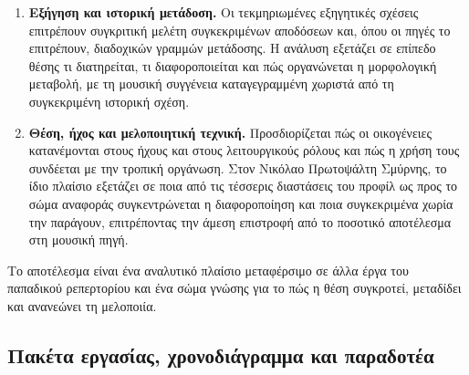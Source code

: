 \documentclass[11pt,a4paper]{article}
\begin{document}
\begin{enumerate}[label=\textbf{\arabic*.},leftmargin=2.2em]
\item \textbf{Εξήγηση και ιστορική μετάδοση.} Οι τεκμηριωμένες εξηγητικές σχέσεις επιτρέπουν συγκριτική μελέτη συγκεκριμένων αποδόσεων και, όπου οι πηγές το επιτρέπουν, διαδοχικών γραμμών μετάδοσης. Η ανάλυση εξετάζει σε επίπεδο θέσης τι διατηρείται, τι διαφοροποιείται και πώς οργανώνεται η μορφολογική μεταβολή, με τη μουσική συγγένεια καταγεγραμμένη χωριστά από τη συγκεκριμένη ιστορική σχέση.
\item \textbf{Θέση, ήχος και μελοποιητική τεχνική.} Προσδιορίζεται πώς οι οικογένειες κατανέμονται στους ήχους και στους λειτουργικούς ρόλους και πώς η χρήση τους συνδέεται με την τροπική οργάνωση. Στον Νικόλαο Πρωτοψάλτη Σμύρνης, το ίδιο πλαίσιο εξετάζει σε ποια από τις τέσσερις διαστάσεις του προφίλ ως προς το σώμα αναφοράς συγκεντρώνεται η διαφοροποίηση και ποια συγκεκριμένα χωρία την παράγουν, επιτρέποντας την άμεση επιστροφή από το ποσοτικό αποτέλεσμα στη μουσική πηγή.
\end{enumerate}
Το αποτέλεσμα είναι ένα αναλυτικό πλαίσιο μεταφέρσιμο σε άλλα έργα του παπαδικού ρεπερτορίου και ένα σώμα γνώσης για το πώς η θέση συγκροτεί, μεταδίδει και ανανεώνει τη μελοποιία.

\subsection{Πακέτα εργασίας, χρονοδιάγραμμα και παραδοτέα}
\end{document}
